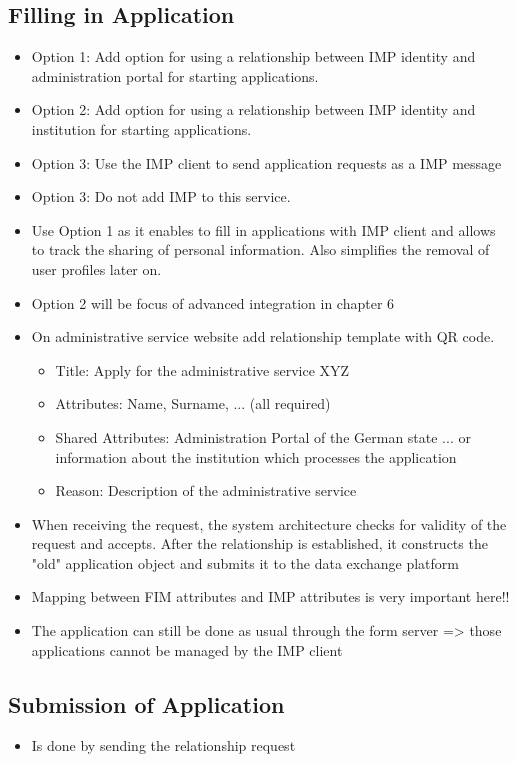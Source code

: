 \subsection{Filling in Application}
\begin{itemize}
    \item Option 1: Add option for using a relationship between IMP identity and administration portal for starting applications.
    \item Option 2: Add option for using a relationship between IMP identity and institution for starting applications.
    \item Option 3: Use the IMP client to send application requests as a IMP message
    \item Option 3: Do not add IMP to this service.
    \item Use Option 1 as it enables to fill in applications with IMP client and allows to track the sharing of personal information. Also simplifies the removal of user profiles later on.
    \item Option 2 will be focus of advanced integration in chapter 6
    \item On administrative service website add relationship template with QR code.
    \begin{itemize}
        \item Title: Apply for the administrative service XYZ
        \item Attributes: Name, Surname, ... (all required)
        \item Shared Attributes: Administration Portal of the German state ... or information about the institution which processes the application
        \item Reason: Description of the administrative service
    \end{itemize}
    \item When receiving the request, the system architecture checks for validity of the request and accepts. After the relationship is established, it constructs the "old" application object and submits it to the data exchange platform
    \item Mapping between FIM attributes and IMP attributes is very important here!!
    \item The application can still be done as usual through the form server => those applications cannot be managed by the IMP client
\end{itemize}

\subsection{Submission of Application}
\begin{itemize}
    \item Is done by sending the relationship request
\end{itemize}

